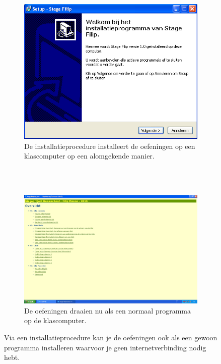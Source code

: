 \documentclass[a4paper,11pt]{article}
\theoremstyle{definition}
\begin{document}
\begin{figure}[h!]
        \centering
        
        \begin{subfigure}{1\textwidth}
          \centering
                \includegraphics[scale=0.5]{installatie.png}
                \caption{De installatieprocedure installeert de oefeningen op een klascomputer op een alomgekende manier.}
        \end{subfigure}%
        \\
        \quad
        \\
        
        \begin{subfigure}{1\textwidth}
           \centering
                \includegraphics[scale=0.3]{normaalprogramma.png}
                \caption{De oefeningen draaien nu als een normaal programma op de klascomputer.}
        \end{subfigure}
        
           \caption{Via een installatieprocedure kan je de oefeningen ook als een gewoon programma installeren waarvoor je geen internetverbinding nodig hebt.}\label{installatie}
\end{figure}
\clearpage
\end{document}
